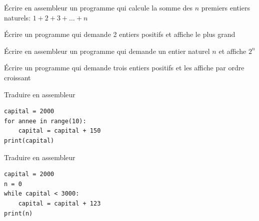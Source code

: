 \begin{minipage}[t]{0.48\linewidth}
	\begin{exercice_cours}{}{}
		Écrire en assembleur un programme qui calcule la somme des $n$ premiers entiers naturels: $1+2+3+\ldots+n$
		
	\end{exercice_cours}
\end{minipage}\hfill
\begin{minipage}[t]{0.48\linewidth}
	\begin{exercice_cours}{}{}
Écrire un programme qui demande 2 entiers positifs et affiche le plus grand
	\end{exercice_cours}
\end{minipage}

\begin{minipage}[t]{0.48\linewidth}
	\begin{exercice_cours}{}{}
		Écrire en assembleur un programme qui demande un entier naturel $n$ et affiche $2^n$
		
	\end{exercice_cours}
\end{minipage}\hfill
\begin{minipage}[t]{0.48\linewidth}
	\begin{exercice_cours}{}{}
Écrire un programme qui demande trois entiers positifs et les affiche par ordre croissant	\end{exercice_cours}
\end{minipage}


\begin{minipage}[t]{0.48\linewidth}
	\begin{exercice_cours}{Traduire en assembleur}{}
\begin{lstlisting}
capital = 2000
for annee in range(10):
	capital = capital + 150
print(capital)
\end{lstlisting}		
	\end{exercice_cours}
\end{minipage}\hfill
\begin{minipage}[t]{0.48\linewidth}
	\begin{exercice_cours}{Traduire en assembleur}{}

\begin{lstlisting}
capital = 2000
n = 0
while capital < 3000:
	capital = capital + 123
print(n)
			\end{lstlisting}
		\end{exercice_cours}
	\end{minipage}


